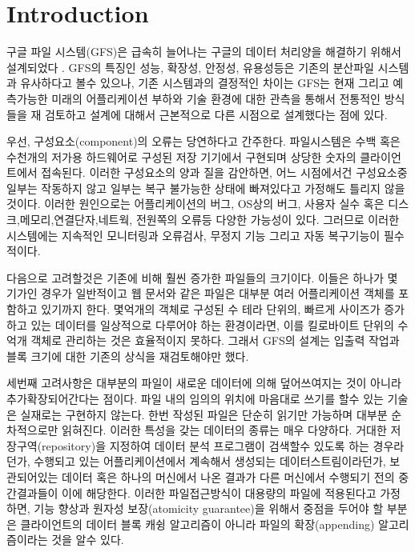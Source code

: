 \documentclass[twocolumn]{article}
\begin{document}
\section{Introduction}


 구글 파일 시스템(GFS)은 급속히 늘어나는 구글의 데이터 처리양을 해결하기 위해서 설계되었다 \cite{Ghemawat:2003:GFS, Ghem:2003:GFS}.  GFS의 특징인 성능, 확장성, 안정성, 유용성등은 기존의 분산파일 시스템과 유사하다고 볼수 있으나,  기존 시스템과의 결정적인 차이는 GFS는 현재 그리고 예측가능한 미래의 어플리케이션 부하와 기술 환경에 대한 관측을 통해서 전통적인 방식들을 재 검토하고 설계에 대해서 근본적으로 다른 시점으로 설계했다는 점에 있다.

 우선, 구성요소(component)의 오류는 당연하다고 간주한다.  파일시스템은 수백 혹은 수천개의 저가용 하드웨어로 구성된 저장 기기에서 구현되며 상당한 숫자의 클라이언트에서 접속된다.  이러한 구성요소의 양과 질을 감안하면, 어느 시점에서건 구성요소중 일부는 작동하지 않고 일부는 복구 불가능한 상태에 빠져있다고 가정해도 틀리지 않을것이다.  이러한 원인으로는 어플리케이션의 버그, OS상의 버그, 사용자 실수 혹은 디스크,메모리,연결단자,네트웍, 전원쪽의 오류등 다양한 가능성이 있다.  그러므로 이러한 시스템에는 지속적인 모니터링과 오류검사, 무정지 기능 그리고 자동 복구기능이 필수적이다.

 다음으로 고려할것은 기존에 비해 훨씬 증가한 파일들의 크기이다.  이들은 하나가 몇 기가인 경우가 일반적이고 웹 문서와 같은 파일은 대부분 여러 어플리케이션 객체를 포함하고 있기까지 한다.  몇억개의 객체로 구성된 수 테라 단위의, 빠르게 사이즈가 증가하고 있는 데이터를 일상적으로 다루어야 하는 환경이라면, 이를 킬로바이트 단위의 수 억개 객체로 관리하는 것은 효율적이지 못하다.  그래서 GFS의 설계는 입출력 작업과 블록 크기에 대한 기존의 상식을 재검토해야만 했다.

 세번째 고려사항은 대부분의 파일이 새로운 데이터에 의해 덮어쓰여지는 것이 아니라 추가확장되어간다는 점이다.  파일 내의 임의의 위치에 마음대로 쓰기를 할수 있는 기술은 실재로는 구현하지 않는다.  한번 작성된 파일은 단순히 읽기만 가능하며 대부분 순차적으로만 읽혀진다.  이러한 특성을 갖는 데이터의 종류는 매우 다양하다.  거대한 저장구역(repository)을 지정하여 데이터 분석 프로그램이 검색할수 있도록 하는 경우라던가, 수행되고 있는 어플리케이션에서 계속해서 생성되는 데이터스트림이라던가, 보관되어있는 데이터 혹은 하나의 머신에서 나온 결과가 다른 머신에서 수행되기 전의 중간결과들이 이에 해당한다.  이러한 파일접근방식이 대용량의 파일에 적용된다고 가정하면, 기능 향상과 원자성 보장(atomicity guarantee)을 위해서 중점을 두어야 할 부분은 클라이언트의 데이터 블록 캐슁 알고리즘이 아니라 파일의 확장(appending) 알고리즘이라는 것을 알수 있다.
\end{document}
